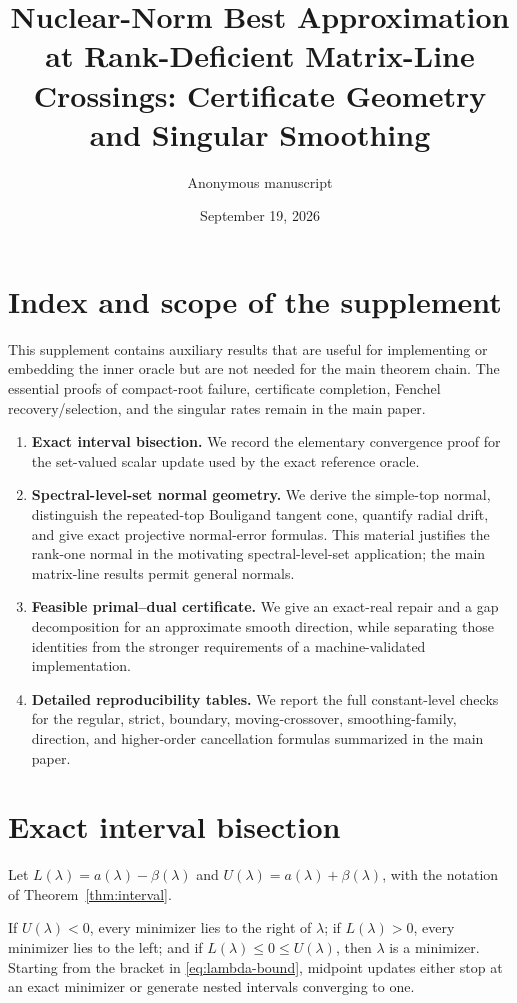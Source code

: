 \documentclass[10pt]{article}
\title{Nuclear-Norm Best Approximation at Rank-Deficient Matrix-Line Crossings:
Certificate Geometry and Singular Smoothing}
\author{Anonymous manuscript}
\date{September 19, 2026}
\begin{document}
\maketitle

\section{Index and scope of the supplement}

This supplement contains auxiliary results that are useful for implementing
or embedding the inner oracle but are not needed for the main theorem chain.
The essential proofs of compact-root failure, certificate completion, Fenchel
recovery/selection, and the singular rates remain in the main paper.

\begin{enumerate}
 \item \textbf{Exact interval bisection.}  We record the elementary
 convergence proof for the set-valued scalar update used by the exact
 reference oracle.
 \item \textbf{Spectral-level-set normal geometry.}  We derive the simple-top
 normal, distinguish the repeated-top Bouligand tangent cone, quantify radial
 drift, and give exact projective normal-error formulas.  This material
 justifies the rank-one normal in the motivating
 spectral-level-set application; the main matrix-line results permit general
 normals.
 \item \textbf{Feasible primal--dual certificate.}  We give an exact-real
 repair and a gap decomposition for an approximate smooth direction, while
 separating those identities from the stronger requirements of a
 machine-validated implementation.
 \item \textbf{Detailed reproducibility tables.}  We report the full
 constant-level checks for the regular, strict, boundary, moving-crossover,
 smoothing-family, direction, and higher-order cancellation formulas
 summarized in the main paper.
\end{enumerate}

\section{Exact interval bisection}

Let \(L(\lambda)=a(\lambda)-\beta(\lambda)\) and
\(U(\lambda)=a(\lambda)+\beta(\lambda)\), with the notation of
Theorem~\ref{thm:interval}.

\begin{proposition}
If \(U(\lambda)<0\), every minimizer lies to the right of \(\lambda\); if
\(L(\lambda)>0\), every minimizer lies to the left; and if
\(L(\lambda)\le0\le U(\lambda)\), then \(\lambda\) is a minimizer.  Starting
from the bracket in \eqref{eq:lambda-bound}, midpoint updates either stop at
an exact minimizer or generate nested intervals converging to one.
\end{proposition}
\end{document}
